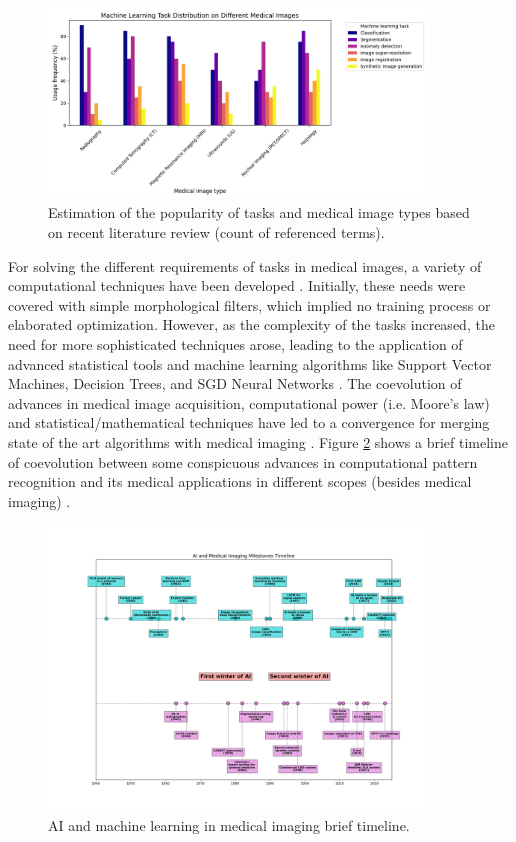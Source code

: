 \begin{figure}
  \centering
  \includegraphics[width=0.9\textwidth]{Cap1/Figures/comparative-tasks-and-medical-image-types.png}
  \caption{Estimation of the popularity of tasks and medical image
    types based on
  recent literature review (count of referenced terms).}
  \label{fig:medical_image_analysis}
\end{figure}

For solving the different requirements of tasks in medical images, a
variety of computational techniques have been developed
\cite{Zhou2021}. Initially, these needs were covered with simple
morphological filters, which implied no training process or
elaborated optimization. However, as the complexity of the tasks
increased, the need for more sophisticated techniques arose, leading
to the application of advanced statistical tools and machine learning
algorithms like Support Vector Machines, Decision Trees, and SGD
Neural Networks \cite{Avanzo2024}. The coevolution of advances in medical image
acquisition, computational power (i.e. Moore's law) and
statistical/mathematical techniques have led to a convergence for
merging state of the art algorithms with medical imaging
\cite{Shalf2020}. Figure \ref{fig:medical-ai-timeline} shows a brief
timeline of coevolution between some conspicuous advances in
computational pattern recognition and its medical applications in
different scopes (besides medical imaging) \cite{Avanzo2024}.

\begin{figure}
  \centering
  \includegraphics[trim={5cm 2cm 5cm
  0},width=0.9\textwidth]{Cap1/Figures/medical-ai-timeline.png}
  \caption{AI and machine learning in medical imaging brief timeline.}
  \label{fig:medical-ai-timeline}
\end{figure}

